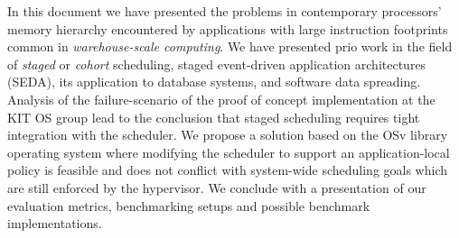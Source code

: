 \documentclass{article}
\begin{document}
In this document we have presented the problems in contemporary processors' memory hierarchy encountered by applications
with large instruction footprints common in \textit{warehouse-scale computing}.
We have presented prio work in the field of
\emph{staged} or \emph{cohort} scheduling,
staged event-driven application architectures (SEDA),
its application to database systems,
and software data spreading.
Analysis of the failure-scenario of the proof of concept implementation at the KIT OS group lead to the conclusion that
staged scheduling requires tight integration with the scheduler.
We propose a solution based on the OSv library operating system where modifying the scheduler to support an
application-local policy is feasible and does not conflict with system-wide scheduling goals which are still enforced by
the hypervisor.
We conclude with a presentation of our evaluation metrics, benchmarking setups and possible benchmark implementations.

\clearpage


\end{document}
